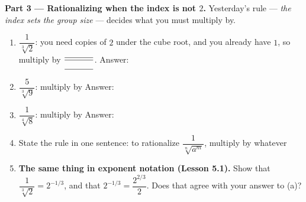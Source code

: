 \documentclass[10pt]{article}
\begin{document}
\begin{tcolorbox}[colback=white, colframe=black!40, title=\textbf{Tier E --- Extension},
    fonttitle=\bfseries, arc=1.5mm, left=3mm, right=3mm, top=2mm, bottom=2mm, breakable]
\vspace{5pt}
\textbf{Part 3 --- Rationalizing when the index is not $2$.} Yesterday's rule --- \emph{the index
sets the group size} --- decides what you must multiply by.
\begin{enumerate}[label=(\alph*), leftmargin=1.9em, itemsep=5pt]
  \item $\dfrac{1}{\sqrt[3]{2}}$: you need \blank{1.0cm} copies of $2$ under the cube root, and you
        already have $1$, so multiply by $\dfrac{\blank{1.2cm}}{\blank{1.2cm}}$. Answer:
        \blank{2.0cm}
  \item $\dfrac{5}{\sqrt[3]{9}}$: \; multiply by \blank{1.4cm} \; Answer: \blank{2.2cm}
  \item $\dfrac{1}{\sqrt[4]{8}}$: \; multiply by \blank{1.4cm} \; Answer: \blank{2.2cm}
  \item State the rule in one sentence: to rationalize $\dfrac{1}{\sqrt[n]{a^{m}}}$, multiply by
        whatever \writeline
  \item \textbf{The same thing in exponent notation (Lesson 5.1).} Show that
        $\dfrac{1}{\sqrt[3]{2}}=2^{-1/3}$, and that $2^{-1/3}=\dfrac{2^{2/3}}{2}$. Does that agree
        with your answer to (a)? 
\end{enumerate}
\end{tcolorbox}
\end{document}
